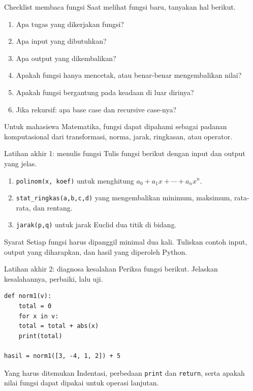 \documentclass[aspectratio=169,11pt]{beamer}
\begin{document}
\begin{frame}{Checklist membaca fungsi}
Saat melihat fungsi baru, tanyakan hal berikut.
\begin{enumerate}
  \item Apa tugas yang dikerjakan fungsi?
  \item Apa input yang dibutuhkan?
  \item Apa output yang dikembalikan?
  \item Apakah fungsi hanya mencetak, atau benar-benar mengembalikan nilai?
  \item Apakah fungsi bergantung pada keadaan di luar dirinya?
  \item Jika rekursif: apa base case dan recursive case-nya?
\end{enumerate}
\vspace{1mm}
\colorbox{LightTeal}{\parbox{.96\linewidth}{\small Untuk mahasiswa Matematika, fungsi dapat dipahami sebagai padanan komputasional dari transformasi, norma, jarak, ringkasan, atau operator.}}
\end{frame}

\begin{frame}[fragile]{Latihan akhir 1: menulis fungsi}
Tulis fungsi berikut dengan input dan output yang jelas.
\begin{enumerate}
  \item \texttt{polinom(x, koef)} untuk menghitung $a_0+a_1x+\cdots+a_nx^n$.
  \item \texttt{stat\_ringkas(a,b,c,d)} yang mengembalikan minimum, maksimum, rata-rata, dan rentang.
  \item \texttt{jarak(p,q)} untuk jarak Euclid dua titik di bidang.
\end{enumerate}
\vspace{1mm}
\begin{block}{Syarat}
Setiap fungsi harus dipanggil minimal dua kali. Tuliskan contoh input, output yang diharapkan, dan hasil yang diperoleh Python.
\end{block}
\end{frame}

\begin{frame}[fragile]{Latihan akhir 2: diagnosa kesalahan}
Periksa fungsi berikut. Jelaskan kesalahannya, perbaiki, lalu uji.
\begin{lstlisting}
def norm1(v):
    total = 0
    for x in v:
    total = total + abs(x)
    print(total)

hasil = norm1([3, -4, 1, 2]) + 5
\end{lstlisting}
\begin{block}{Yang harus ditemukan}
Indentasi, perbedaan \texttt{print} dan \texttt{return}, serta apakah nilai fungsi dapat dipakai untuk operasi lanjutan.
\end{block}
\end{frame}
\end{document}
